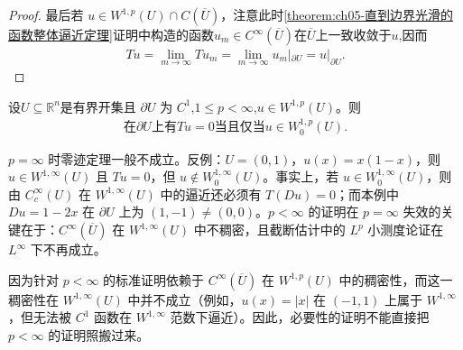 \documentclass[../../main.tex]{subfiles}%
\begin{document}
\begin{proof}
最后若 $u\in W^{1,p}(U)\cap C(\overline{U})$，注意此时\cref{theorem:ch05-直到边界光滑的函数整体逼近定理}证明中构造的函数$u_{m}\in C^{\infty}(\overline{U})$在$\overline{U}$上一致收敛于$u$,因而
\begin{align*}
Tu=\underset{m\rightarrow \infty}{\lim}Tu_m=\underset{m\rightarrow \infty}{\lim}u_m|_{\partial U}=u|_{\partial U}.
\end{align*}
\end{proof}

\begin{theorem}[$W^{1,p}$ 中的零迹函数]\label{theorem:ch05-零迹函数}
设$U\subseteq \mathbb{R}^n$是有界开集且 $\partial U$ 为 $C^{1}$,$1\leqslant p<\infty$,$u\in W^{1,p}(U)$。则
\begin{align*}
\text{在}\partial U\text{上}\text{有}Tu=0\text{当且仅当}u\in W^{1,p}_{0}(U).
\end{align*}
\end{theorem}
\begin{remark}
$p=\infty$ 时零迹定理一般不成立。反例：$U=(0,1)$，$u(x)=x(1-x)$，则 $u\in W^{1,\infty}(U)$ 且 $Tu=0$，但 $u\notin W^{1,\infty}_0(U)$。事实上，若 $u\in W^{1,\infty}_0(U)$，则由 $C_c^\infty(U)$ 在 $W^{1,\infty}(U)$ 中的逼近还必须有 $T(Du)=0$；而本例中 $Du=1-2x$ 在 $\partial U$ 上为 $(1,-1)\neq(0,0)$。$p<\infty$ 的证明在 $p=\infty$ 失效的关键在于：$C^\infty(\overline U)$ 在 $W^{1,\infty}(U)$ 中不稠密，且截断估计中的 $L^p$ 小测度论证在 $L^\infty$ 下不再成立。
\end{remark}
\begin{remark}
因为针对 \(p<\infty\) 的标准证明依赖于 \(C^\infty(\overline{U})\) 在 \(W^{1,p}(U)\) 中的稠密性，而这一稠密性在 \(W^{1,\infty}(U)\) 中并不成立（例如，\(u(x)=|x|\) 在 \((-1,1)\) 上属于 \(W^{1,\infty}\)，但无法被 \(C^1\) 函数在 \(W^{1,\infty}\) 范数下逼近）。因此，必要性的证明不能直接把 \(p<\infty\) 的证明照搬过来。
\end{remark}
\end{document}
